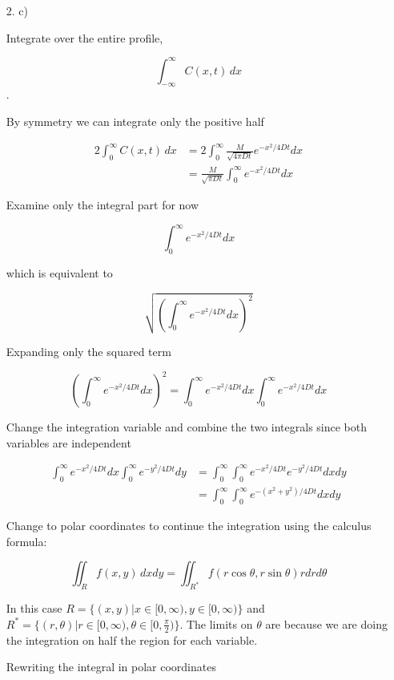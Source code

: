\documentclass[11pt]{article}
\begin{document}
\begin{enumerate}
\item[2. c)]

Integrate over the entire profile, 

$$\int^\infty_{-\infty}C(x,t)\,dx$$.

By symmetry we can integrate only the positive half

\begin{align}
2\int^\infty_{0}C(x,t)\,dx &= 2\int^\infty_{0}\frac{M}{\sqrt{4\pi Dt}}e^{-x^2/4Dt}dx\nonumber\\
& = \frac{M}{\sqrt{\pi Dt}}\int^\infty_{0}e^{-x^2/4Dt}dx
\end{align}

Examine only the integral part for now

\begin{equation}
\int^\infty_{0}e^{-x^2/4Dt}dx
\end{equation}

which is equivalent to 

\begin{equation}
\sqrt{\left(\int^\infty_{0}e^{-x^2/4Dt}dx\right)^2}
\end{equation}

Expanding only the squared term

$$\left(\int^\infty_{0}e^{-x^2/4Dt}dx\right)^2 = \int^\infty_{0}e^{-x^2/4Dt}dx\int^\infty_{0}e^{-x^2/4Dt}dx$$

Change the integration variable and combine the two integrals since both variables are independent

\begin{align}
 \int^\infty_{0}e^{-x^2/4Dt}dx\int^\infty_{0}e^{-y^2/4Dt}dy &= \int^\infty_{0}\int^\infty_{0}e^{-x^2/4Dt}e^{-y^2/4Dt}dxdy\nonumber\\
& = \int^\infty_{0}\int^\infty_{0}e^{-(x^2+y^2)/4Dt}dxdy\nonumber
\end{align}

Change to polar coordinates to continue the integration using the calculus formula:

$$\iint_Rf(x,y)\, dxdy = \iint_{R^*}f(r\cos\theta,r\sin\theta)rdrd\theta$$

In this case $R = \{(x,y) | x\in[0,\infty),y\in[0,\infty)\}$ and $R^* = \{(r,\theta) | r\in[0,\infty),\theta\in[0,\frac{\pi}{2})\}$.  The limits on $\theta$ are because we are doing the integration on half the region for each variable. 

Rewriting the integral in polar coordinates


\end{enumerate}
\end{document}
